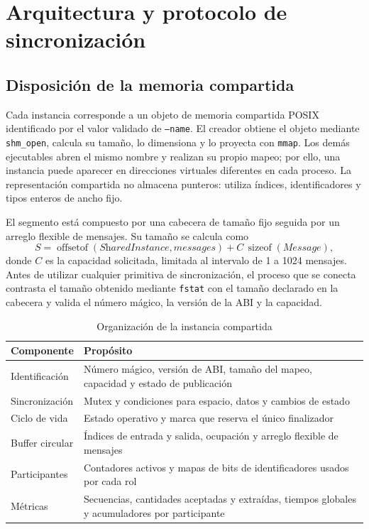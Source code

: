 \documentclass[conference]{IEEEtran}
\begin{document}
\section{Arquitectura y protocolo de sincronización}

\subsection{Disposición de la memoria compartida}
Cada instancia corresponde a un objeto de memoria compartida POSIX identificado por el valor validado de \texttt{--name}. El creador obtiene el objeto mediante \texttt{shm\_open}, calcula su tamaño, lo dimensiona y lo proyecta con \texttt{mmap}. Los demás ejecutables abren el mismo nombre y realizan su propio mapeo; por ello, una instancia puede aparecer en direcciones virtuales diferentes en cada proceso. La representación compartida no almacena punteros: utiliza índices, identificadores y tipos enteros de ancho fijo.

El segmento está compuesto por una cabecera de tamaño fijo seguida por un arreglo flexible de mensajes. Su tamaño se calcula como
\begin{equation}
S=\operatorname{offsetof}(\textit{SharedInstance},\textit{messages})
  + C\,\operatorname{sizeof}(\textit{Message}),
\end{equation}
donde $C$ es la capacidad solicitada, limitada al intervalo de 1 a 1024 mensajes. Antes de utilizar cualquier primitiva de sincronización, el proceso que se conecta contrasta el tamaño obtenido mediante \texttt{fstat} con el tamaño declarado en la cabecera y valida el número mágico, la versión de la ABI y la capacidad.

\begin{table}[htbp]
\caption{Organización de la instancia compartida}\label{tab:memoria}
\centering\footnotesize
\begin{tabular}{p{}p{}}
\toprule
Componente & Propósito \\
\midrule
Identificación & Número mágico, versión de ABI, tamaño del mapeo, capacidad y estado de publicación \\
Sincronización & Mutex y condiciones para espacio, datos y cambios de estado \\
Ciclo de vida & Estado operativo y marca que reserva el único finalizador \\
Buffer circular & Índices de entrada y salida, ocupación y arreglo flexible de mensajes \\
Participantes & Contadores activos y mapas de bits de identificadores usados por cada rol \\
Métricas & Secuencias, cantidades aceptadas y extraídas, tiempos globales y acumuladores por participante \\
\bottomrule
\end{tabular}
\end{table}
\end{document}
